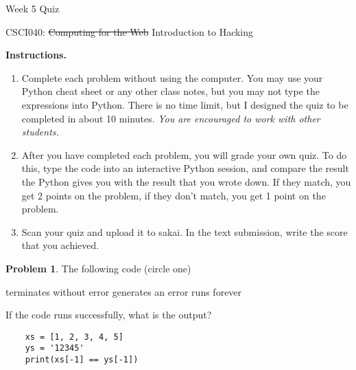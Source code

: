 \documentclass[10pt]{article}
\theoremstyle{definition}
\newtheorem{problem}{Problem}
\begin{document}
\begin{center}
    {
\Large
Week 5 Quiz
}

    \vspace{0.1in}
    CSCI040: \sout{Computing for the Web} Introduction to Hacking

    \vspace{0.1in}
\end{center}

\vspace{0.15in}
%
%

\noindent\textbf{Instructions.}
\begin{enumerate}
\item
Complete each problem without using the computer.  
You may use your Python cheat sheet or any other class notes,
but you may not type the expressions into Python.
There is no time limit, but I designed the quiz to be completed in about 10 minutes.
\emph{You are encouraged to work with other students.}
\item
After you have completed each problem, you will grade your own quiz.
To do this, type the code into an interactive Python session,
and compare the result the Python gives you with the result that you wrote down.
If they match, you get 2 points on the problem,
if they don't match, you get 1 point on the problem.
\item
Scan your quiz and upload it to sakai.
In the text submission, write the score that you achieved.
\end{enumerate}
\vspace{0.15in}

\begin{problem}
    The following code (circle one)

    \vspace{0.25in}
    \hspace{0.5in}terminates without error 
    \hspace{1in}generates an error
    \hspace{1in}runs forever
    \vspace{0.25in}

    \noindent
    If the code runs successfully, what is the output?
\end{problem}
\begin{lstlisting}
    xs = [1, 2, 3, 4, 5]
    ys = '12345'
    print(xs[-1] == ys[-1])
\end{lstlisting}
\vspace{1.5in}
\end{document}
